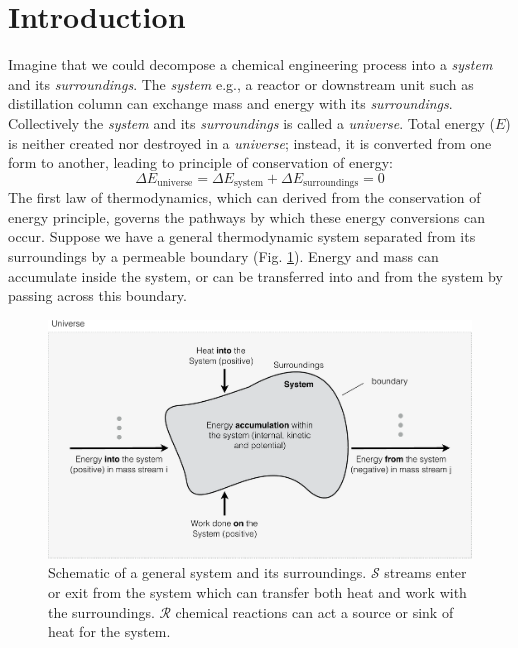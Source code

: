 \documentclass[11pt]{article}
\theoremstyle{definition}
\begin{document}
\clearpage

\section*{Introduction}
Imagine that we could decompose a chemical engineering process into a \textit{system} and its \textit{surroundings}.
The \textit{system} e.g., a reactor or downstream unit such as distillation column can exchange mass and energy with its \textit{surroundings}.
Collectively the \textit{system} and its \textit{surroundings} is called a \textit{universe}.
Total energy ($E$) is neither created nor destroyed in a \textit{universe};
instead, it is converted from one form to another, leading to principle of conservation of energy:
\begin{equation}
	\Delta{E}_{\mathrm{universe}} = \Delta{E}_{\mathrm{system}}+\Delta{E}_{\mathrm{surroundings}} = 0
\end{equation}
The first law of thermodynamics, which can derived from the conservation of energy principle, governs the pathways by which these energy conversions can occur.
Suppose we have a general thermodynamic system separated from its surroundings by a permeable boundary (Fig. \ref{fig-energy-schematic}).
Energy and mass can accumulate inside the system, or can be transferred into and from the system by passing across this boundary.
\begin{figure}[!ht]\center
  \includegraphics[width=1.0\textwidth]{./figs/EnergySchematic.pdf}
  \caption{Schematic of a general system and its surroundings. $\mathcal{S}$ streams enter or exit from the system which can transfer both heat and work with the surroundings.
  $\mathcal{R}$ chemical reactions can act a source or sink of heat for the system.}
  \label{fig-energy-schematic}
\end{figure}
\end{document}
